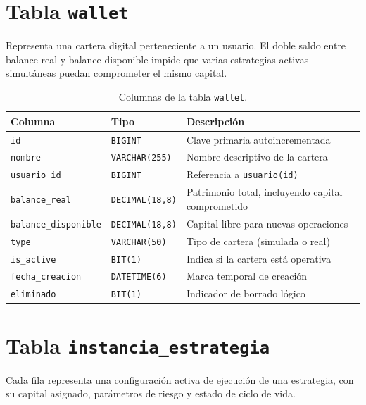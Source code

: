 \section*{Tabla \texttt{wallet}}

Representa una cartera digital perteneciente a un usuario. El doble saldo entre balance real y balance disponible impide que varias estrategias activas simultáneas puedan comprometer el mismo capital.

\begin{table}[h]
\centering
\caption{Columnas de la tabla \texttt{wallet}.}
\label{tab:sql-wallet}
\begin{tabular}{@{}llp{6.5cm}@{}}
\toprule
\textbf{Columna} & \textbf{Tipo} & \textbf{Descripción} \\
\midrule
\texttt{id}                  & \texttt{BIGINT}        & Clave primaria autoincrementada \\
\texttt{nombre}              & \texttt{VARCHAR(255)}  & Nombre descriptivo de la cartera \\
\texttt{usuario\_id}         & \texttt{BIGINT}        & Referencia a \texttt{usuario(id)} \\
\texttt{balance\_real}       & \texttt{DECIMAL(18,8)} & Patrimonio total, incluyendo capital comprometido \\
\texttt{balance\_disponible} & \texttt{DECIMAL(18,8)} & Capital libre para nuevas operaciones \\
\texttt{type}                & \texttt{VARCHAR(50)}   & Tipo de cartera (simulada o real) \\
\texttt{is\_active}          & \texttt{BIT(1)}        & Indica si la cartera está operativa \\
\texttt{fecha\_creacion}     & \texttt{DATETIME(6)}   & Marca temporal de creación \\
\texttt{eliminado}           & \texttt{BIT(1)}        & Indicador de borrado lógico \\
\bottomrule
\end{tabular}
\end{table}

\section*{Tabla \texttt{instancia\_estrategia}}

Cada fila representa una configuración activa de ejecución de una estrategia, con su capital asignado, parámetros de riesgo y estado de ciclo de vida.

